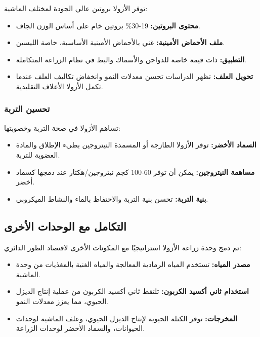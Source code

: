 توفر الأزولا بروتين عالي الجودة لمختلف الماشية:

\begin{itemize}
    \item \textbf{محتوى البروتين:} 19-30\% بروتين خام على أساس الوزن الجاف.
    
    \item \textbf{ملف الأحماض الأمينية:} غني بالأحماض الأمينية الأساسية، خاصة الليسين.
    
    \item \textbf{التطبيق:} ذات قيمة خاصة للدواجن والأسماك والبط في نظام الزراعة المتكاملة.
    
    \item \textbf{تحويل العلف:} تظهر الدراسات تحسن معدلات النمو وانخفاض تكاليف العلف عندما تكمل الأزولا الأعلاف التقليدية.
\end{itemize}

\subsubsection{تحسين التربة}

تساهم الأزولا في صحة التربة وخصوبتها:

\begin{itemize}
    \item \textbf{السماد الأخضر:} توفر الأزولا الطازجة أو المسمدة النيتروجين بطيء الإطلاق والمادة العضوية للتربة.
    
    \item \textbf{مساهمة النيتروجين:} يمكن أن توفر 60-100 كجم نيتروجين/هكتار عند دمجها كسماد أخضر.
    
    \item \textbf{بنية التربة:} تحسن بنية التربة والاحتفاظ بالماء والنشاط الميكروبي.
\end{itemize}

\subsection{التكامل مع الوحدات الأخرى}

تم دمج وحدة زراعة الأزولا استراتيجيًا مع المكونات الأخرى لاقتصاد الطور الدائري:

\begin{itemize}
    \item \textbf{مصدر المياه:} تستخدم المياه الرمادية المعالجة والمياه الغنية بالمغذيات من وحدة الماشية.
    
    \item \textbf{استخدام ثاني أكسيد الكربون:} تلتقط ثاني أكسيد الكربون من عملية إنتاج الديزل الحيوي، مما يعزز معدلات النمو.
    
    \item \textbf{المخرجات:} توفر الكتلة الحيوية لإنتاج الديزل الحيوي، وعلف الماشية لوحدات الحيوانات، والسماد الأخضر لوحدات الزراعة.
\end{itemize}

